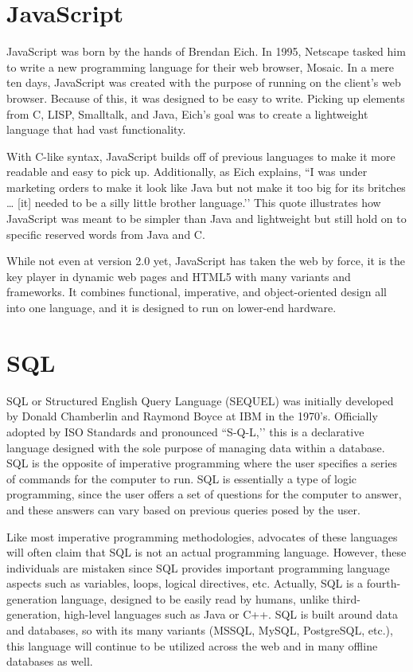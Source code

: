 \documentclass[11pt]{article}
\begin{document}
\section{JavaScript}
JavaScript was born by the hands of Brendan Eich.\cite{sean-javascript} In 1995, Netscape tasked him to write a new programming language for their web browser, Mosaic. In a mere ten days, JavaScript was created with the purpose of running on the client’s web browser. Because of this, it was designed to be easy to write. Picking up elements from C, LISP, Smalltalk, and Java, Eich’s goal was to create a lightweight language that had vast functionality.

With C-like syntax, JavaScript builds off of previous languages to make it more readable and easy to pick up. Additionally, as Eich explains, ``I was under marketing orders to make it look like Java but not make it too big for its britches … [it] needed to be a silly little brother language.’’\cite{sean-javascript} This quote illustrates how JavaScript was meant to be simpler than Java and lightweight but still hold on to specific reserved words from Java and C.

While not even at version 2.0 yet, JavaScript has taken the web by force, it is the key player in dynamic web pages and HTML5 with many variants and frameworks. It combines functional, imperative, and object-oriented design all into one language, and it is designed to run on lower-end hardware.


\section{SQL}
SQL or Structured English Query Language (SEQUEL) was initially developed by Donald Chamberlin and Raymond Boyce at IBM in the 1970’s.\cite{sean-sql-1} Officially adopted by ISO Standards and pronounced ``S-Q-L,’’ this is a declarative language designed with the sole purpose of managing data within a database. SQL is the opposite of imperative programming where the user specifies a series of commands for the computer to run. SQL is essentially a type of logic programming, since the user offers a set of questions for the computer to answer, and these answers can vary based on previous queries posed by the user.\cite{sean-sql-3}

Like most imperative programming methodologies, advocates of these languages will often claim that SQL is not an actual programming language. However, these individuals are mistaken since SQL provides important programming language aspects such as variables, loops, logical directives, etc.\cite{sean-sql-2} Actually, SQL is a fourth-generation language, designed to be easily read by humans, unlike third-generation, high-level languages such as Java or C++.\cite{sean-sql-2} SQL is built around data and databases, so with its many variants (MSSQL, MySQL, PostgreSQL, etc.), this language will continue to be utilized across the web and in many offline databases as well.
\end{document}
